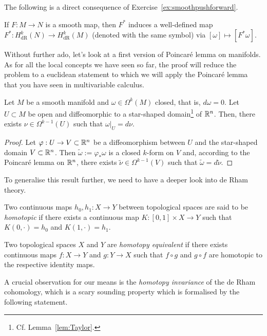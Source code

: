 The following is a direct consequence of Exercise~\ref{ex:smoothpushforward}.

\begin{corollary}
  If $F:M\to N$ is a smooth map, then $F^*$ induces a well-defined map $F^*:H_{\mathrm{dR}}^k(N) \to H_{\mathrm{dR}}^k(M)$ (denoted with the same symbol) via $[\omega]\mapsto[F^*\omega]$.
\end{corollary}

Without further ado, let's look at a first version of Poincar\'e lemma on manifolds.
As for all the local concepts we have seen so far, the proof will reduce the problem to a euclidean statement to which we will apply the Poincar\'e lemma that you have seen in multivariable calculus.

\begin{theorem}
  Let $M$ be a smooth manifold and $\omega\in\Omega^k(M)$ closed, that is, $d\omega = 0$.
  Let $U\subset M$ be open and diffeomorphic to a star-shaped domain\footnote{Cf. Lemma~\ref{lem:Taylor}.} of $\mathbb{R}^n$.
  Then, there exists $\nu\in\Omega^{k-1}(U)$ such that $\omega|_U = d\nu$.
\end{theorem}
\begin{proof}
  Let $\varphi: U \to V\subset\mathbb{R}^n$ be a diffeomorphism between $U$ and the star-shaped domain $V\subset\mathbb{R}^n$.
  Then $\widetilde\omega := \varphi_*\omega$ is a closed $k$-form on $V$ and, according to the Poincar\'e lemma on $\mathbb{R}^n$, there exists $\widetilde \nu \in \Omega^{k-1}(V)$ such that $\widetilde\omega = d\widetilde\nu$.
\end{proof}

To generalise this result further, we need to have a deeper look into de Rham theory.

\begin{definition}
  Two continuous maps $h_0, h_1:X\to Y$ between topological spaces are said to be \emph{homotopic} if there exists a continuous map $K: [0,1]\times X\to Y$ such that $K(0, \cdot) = h_0$ and $K(1,\cdot) = h_1$.

  Two topological spaces $X$ and $Y$ are \emph{homotopy equivalent} if there exists continuous maps $f:X\to Y$ and $g:Y\to X$ such that $f\circ g$ and $g\circ f$ are homotopic to the respective identity maps.
\end{definition}

A crucial observation for our means is the \emph{homotopy invariance} of the de Rham cohomology, which is a scary sounding property which is formalised by the following statement.

